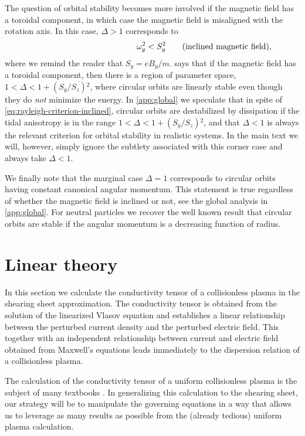 \documentclass[aps,pre,notitlepage,amsmath,amssymb,amsfonts,nobibnotes,nofootinbib]{revtex4-1}
\begin{document}
The question of orbital stability becomes more involved if the magnetic field
has a toroidal component, in which case the magnetic field is misaligned with
the rotation axis. In this case, $\Delta>1$ corresponds to
\begin{equation}
  \label{eq:rayleigh-criterion-inclined}
  \phantom{\qquad(\textrm{inclined magnetic field})}
  \omg^2 < S_y^2
  \qquad(\textrm{inclined magnetic field}),
\end{equation}
where we remind the reader that $S_y=eB_y/m$.
 says that if the magnetic field has a
toroidal component, then there is a region of parameter space,
$1<\Delta<1+(S_y/S_z){}^2$, where circular orbits are linearly stable even
though they do \emph{not} minimize the energy. In \cref{app:global} we
speculate that in spite of \cref{eq:rayleigh-criterion-inclined}, circular
orbits are destabilized by dissipation if the tidal anisotropy is in the range
$1<\Delta<1+(S_y/S_z){}^2$, and that $\Delta<1$ is always the relevant
criterion for orbital stability in realistic systems. In the main text we
will, however, simply ignore the subtlety associated with this corner case and
always take $\Delta<1$.

We finally note that the marginal case $\Delta=1$ corresponds to circular
orbits having constant canonical angular momentum. This statement is true
regardless of whether the magnetic field is inclined or not, see the global
analysis in \cref{app:global}. For neutral particles we recover the well known
result that circular orbits are stable if the angular momentum is a decreasing
function of radius.

\section{Linear theory}
\label{sec:linear-theory}

In this section we calculate the conductivity tensor of a collisionless plasma
in the shearing sheet approximation. The conductivity tensor is obtained from
the solution of the linearized Vlasov equation and establishes a linear
relationship between the perturbed current density and the perturbed electric
field. This together with an independent relationship between current and
electric field obtained from Maxwell's equations leads immediately to the
dispersion relation of a collisionless plasma.

The calculation of the conductivity tensor of a uniform collisionless plasma
is the subject of many textbooks
\citep[e.g.][]{Krall1973,Ichimaru1973,Stix1992}. In generalizing this
calculation to the shearing sheet, our strategy will be to manipulate the
governing equations in a way that allows us to leverage as many results as
possible from the (already tedious) uniform plasma calculation.
\end{document}
